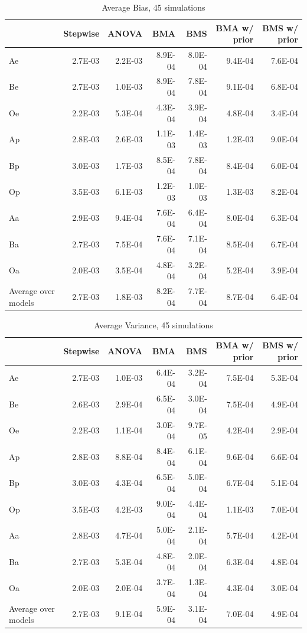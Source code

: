 \documentclass[]{article}
\begin{document}
\begin{table}[ht]
\centering
\caption{Average Bias, 45 simulations}
\begin{tabular}{lrrrrrr}
 \hline
 & Stepwise & ANOVA & BMA & BMS & BMA w/ prior & BMS w/ prior \\ 
  \hline
Ae & 2.7E-03 & 2.2E-03 & 8.9E-04 & 8.0E-04 & 9.4E-04 & 7.6E-04 \\ 
  Be & 2.7E-03 & 1.0E-03 & 8.9E-04 & 7.8E-04 & 9.1E-04 & 6.8E-04 \\ 
  Oe & 2.2E-03 & 5.3E-04 & 4.3E-04 & 3.9E-04 & 4.8E-04 & 3.4E-04 \\ 
  Ap & 2.8E-03 & 2.6E-03 & 1.1E-03 & 1.4E-03 & 1.2E-03 & 9.0E-04 \\ 
  Bp & 3.0E-03 & 1.7E-03 & 8.5E-04 & 7.8E-04 & 8.4E-04 & 6.0E-04 \\ 
  Op & 3.5E-03 & 6.1E-03 & 1.2E-03 & 1.0E-03 & 1.3E-03 & 8.2E-04 \\ 
  Aa & 2.9E-03 & 9.4E-04 & 7.6E-04 & 6.4E-04 & 8.0E-04 & 6.3E-04 \\ 
  Ba & 2.7E-03 & 7.5E-04 & 7.6E-04 & 7.1E-04 & 8.5E-04 & 6.7E-04 \\ 
  Oa & 2.0E-03 & 3.5E-04 & 4.8E-04 & 3.2E-04 & 5.2E-04 & 3.9E-04 \\ 
  \hline
  Average over models & 2.7E-03 & 1.8E-03 & 8.2E-04 & 7.7E-04 & 8.7E-04 & 6.4E-04 \\ 
   \hline
\end{tabular}
\end{table}

\begin{table}[ht]
\centering
\caption{Average Variance, 45 simulations}
\begin{tabular}{lrrrrrr}
\hline
 & Stepwise & ANOVA & BMA & BMS & BMA w/ prior & BMS w/ prior \\ 
  \hline
Ae & 2.7E-03 & 1.0E-03 & 6.4E-04 & 3.2E-04 & 7.5E-04 & 5.3E-04 \\ 
  Be & 2.6E-03 & 2.9E-04 & 6.5E-04 & 3.0E-04 & 7.5E-04 & 4.9E-04 \\ 
  Oe & 2.2E-03 & 1.1E-04 & 3.0E-04 & 9.7E-05 & 4.2E-04 & 2.9E-04 \\ 
  Ap & 2.8E-03 & 8.8E-04 & 8.4E-04 & 6.1E-04 & 9.6E-04 & 6.6E-04 \\ 
  Bp & 3.0E-03 & 4.3E-04 & 6.5E-04 & 5.0E-04 & 6.7E-04 & 5.1E-04 \\ 
  Op & 3.5E-03 & 4.2E-03 & 9.0E-04 & 4.4E-04 & 1.1E-03 & 7.0E-04 \\ 
  Aa & 2.8E-03 & 4.7E-04 & 5.0E-04 & 2.1E-04 & 5.7E-04 & 4.2E-04 \\ 
  Ba & 2.7E-03 & 5.3E-04 & 4.8E-04 & 2.0E-04 & 6.3E-04 & 4.8E-04 \\ 
  Oa & 2.0E-03 & 2.0E-04 & 3.7E-04 & 1.3E-04 & 4.3E-04 & 3.0E-04 \\
  \hline 
  Average over models & 2.7E-03 & 9.1E-04 & 5.9E-04 & 3.1E-04 & 7.0E-04 & 4.9E-04 \\ 
   \hline
\end{tabular}
\end{table}
\end{document}
